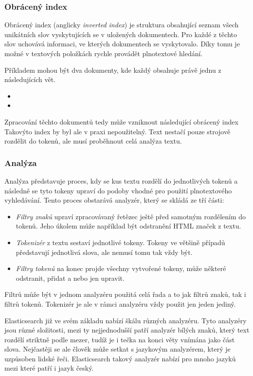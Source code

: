\subsubsection*{Obrácený index}
Obrácený index (anglicky \emph{inverted index}) je struktura obsahující seznam všech unikátních slov vyskytujících se v uložených dokumentech. Pro každé z těchto slov uchovává informaci, ve kterých dokumentech se vyskytovalo. Díky tomu je možné v textových položkách rychle provádět plnotextové hledání.

Příkladem mohou být dva dokumenty, kde každý obsahuje právě jednu z následujících vět.
\begin{itemize}
    \item 
    \item 
\end{itemize}
Zpracování těchto dokumentů tedy může vzniknout následující obrácený index
Takovýto index by byl ale v praxi nepoužitelný. Text nestačí pouze strojově rozdělit do tokenů, ale musí proběhnout celá analýza textu.

\subsubsection*{Analýza}
Analýza představuje proces, kdy se kus textu rozdělí do jednotlivých tokenů a následně se tyto tokeny upraví do podoby vhodné pro použití plnotextového vyhledávání. Tento proces obstarává analyzér, který se skládá ze tří části:
\begin{itemize}
    \item \emph{Filtry znaků} upraví zpracovávaný řetězec ještě před samotným rozdělením do tokenů. Jeho úkolem může například být odstranění HTML značek z textu.
    \item \emph{Tokenizér} z textu sestaví jednotlivé tokeny. Tokeny ve většině případů představují jednotlivá slova, ale nemusí tomu tak vždy být. 
    \item \emph{Filtry tokenů} na konec projde všechny vytvořené tokeny, může některé odstranit, přidat a nebo jen upravit. 
\end{itemize}
Filtrů může být v jednom analyzéru použitá celá řada a to jak filtrů znaků, tak i filtrů tokenů. Tokenizér je ale v rámci analyzéru vždy použit jen jeden jediný.

Elasticsearch již ve svém základu nabízí škálu různých analyzéru. Tyto analyzéry jsou různé složitosti, mezi ty nejjednodušší patří analyzér bílých znaků, který text rozdělí striktně podle mezer, tudíž je i tečka na konci věty vnímána jako část slova. Nejčastěji se ale člověk může setkat s jazykovým analyzérem, který je uzpůsoben lidské řeči. Elasticsearch takový analyzér nabízí pro mnoho jazyků mezi které patří i jazyk český.

